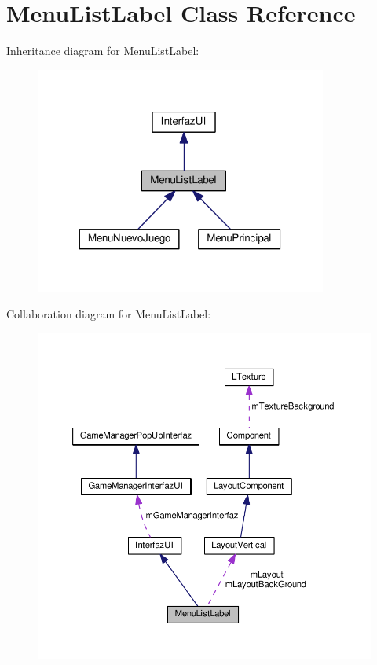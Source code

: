 \hypertarget{class_menu_list_label}{}\section{Menu\+List\+Label Class Reference}
\label{class_menu_list_label}


Inheritance diagram for Menu\+List\+Label\+:\nopagebreak
\begin{figure}[H]
\begin{center}
\leavevmode
\includegraphics[width=272pt]{class_menu_list_label__inherit__graph}
\end{center}
\end{figure}


Collaboration diagram for Menu\+List\+Label\+:
\nopagebreak
\begin{figure}[H]
\begin{center}
\leavevmode
\includegraphics[width=350pt]{class_menu_list_label__coll__graph}
\end{center}
\end{figure}
